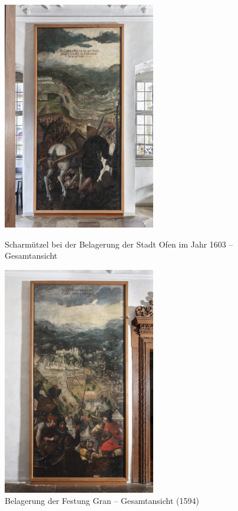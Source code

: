 \documentclass[
  a4paper,
]{book}
\begin{document}
\begin{figure}
\includegraphics[height=10cm]{images/fmd10005849a.jpg}

\caption{Scharmützel bei der Belagerung der Stadt Ofen im Jahr 1603 – Gesamtansicht}
\label{fig:{images/fmd10005849a.jpg}}

\clearpage

\centering

\includegraphics[height=10cm]{images/fmd10005841a.jpg}

\caption{Belagerung der Festung Gran – Gesamtansicht (1594)}
\label{fig:{images/fmd10005841a.jpg}}

\clearpage

\centering


\end{figure}
\end{document}
